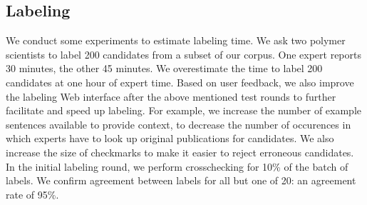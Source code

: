 
\subsection{Labeling}\label{sec:labeling}
We conduct some experiments to estimate labeling time. 
We ask two polymer scientists to label 200 candidates from a subset of our corpus.
One expert reports 30 minutes, the other 45 minutes. We overestimate the time to label 200 candidates at one hour of expert time.
Based on user feedback, we also improve the labeling Web interface after the above mentioned test rounds to further facilitate and speed up labeling.
For example, we increase the number of example sentences available to provide context, to decrease the number of occurences in which experts have to look up original publications for candidates.
We also increase the size of checkmarks to make it easier to reject erroneous candidates.
In the initial labeling round, 
we perform crosschecking for 10\% of the batch of labels. 
We confirm agreement between labels for all but one of 20: an agreement rate of 95\%.

